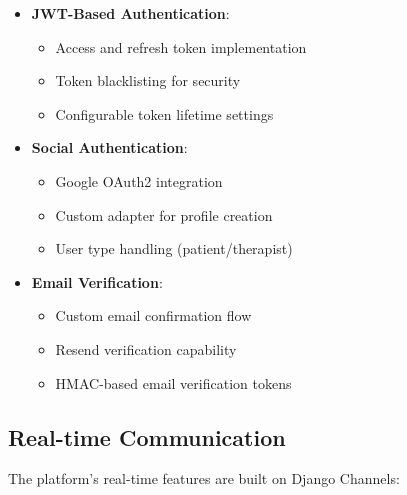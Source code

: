 \begin{itemize}
  \item \textbf{JWT-Based Authentication}:
    \begin{itemize}
      \item Access and refresh token implementation
      \item Token blacklisting for security
      \item Configurable token lifetime settings
    \end{itemize}
    
  \item \textbf{Social Authentication}:
    \begin{itemize}
      \item Google OAuth2 integration
      \item Custom adapter for profile creation
      \item User type handling (patient/therapist)
    \end{itemize}
    
  \item \textbf{Email Verification}:
    \begin{itemize}
      \item Custom email confirmation flow
      \item Resend verification capability
      \item HMAC-based email verification tokens
    \end{itemize}
\end{itemize}

\subsection{Real-time Communication}
The platform's real-time features are built on Django Channels:

